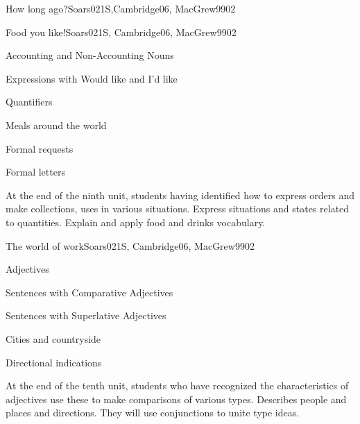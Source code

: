 \begin{syllabus}
\begin{unit}{How long ago?}{}{Soars021S,Cambridge06, MacGrew99}{0}{2}
\end{unit}

\begin{unit}{Food you like!}{}{Soars021S, Cambridge06, MacGrew99}{0}{2}
   \begin{topics}
      \item Accounting and Non-Accounting Nouns
      \item Expressions with Would like and I'd like
      \item Quantifiers
      \item Meals around the world
      \item Formal requests
      \item Formal letters
   \end{topics}

   \begin{learningoutcomes}
      \item At the end of the ninth unit, students having identified how to express orders and make collections, uses in various situations. Express situations and states related to quantities. Explain and apply food and drinks vocabulary.
   \end{learningoutcomes}
\end{unit}

\begin{unit}{The world of work}{}{Soars021S, Cambridge06, MacGrew99}{0}{2}
   \begin{topics}
      \item Adjectives
      \item Sentences with Comparative Adjectives
      \item Sentences with Superlative Adjectives
      \item Cities and countryside
      \item Directional indications
   \end{topics}

   \begin{learningoutcomes}
      \item At the end of the tenth unit, students who have recognized the characteristics of adjectives use these to make comparisons of various types. Describes people and places and directions. They will use conjunctions to unite type ideas.
   \end{learningoutcomes}

\end{unit}


\end{syllabus}
